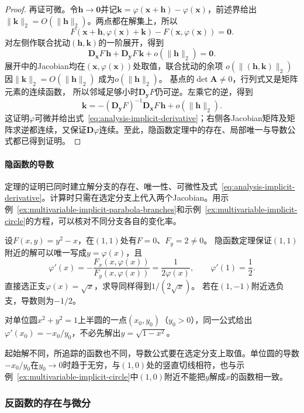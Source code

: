 \begin{proof}
再证可微。令$\bm{h}\to\bm{0}$并记$\bm{k}=\varphi(\bm{x}+\bm{h})-\varphi(\bm{x})$，前述界给出$\lVert\bm{k}\rVert_2=O(\lVert\bm{h}\rVert_2)$。两点都在解集上，所以
\[
 F(\bm{x}+\bm{h},\varphi(\bm{x})+\bm{k})-F(\bm{x},\varphi(\bm{x}))=\bm{0}.
\]
对左侧作联合扰动$(\bm h,\bm k)$的一阶展开，得到
\[
 \bm{D}_{\bm{x}}F\,\bm{h}+\bm{D}_{\bm{y}}F\,\bm{k}+o(\lVert\bm{h}\rVert_2)=\bm{0}.
\]
展开中的Jacobian均在$(\bm x,\varphi(\bm x))$处取值，联合扰动的余项
$o(\lVert(\bm h,\bm k)\rVert_2)$因$\lVert\bm k\rVert_2=O(\lVert\bm h\rVert_2)$
成为$o(\lVert\bm h\rVert_2)$。
基点的$\det\bm A\neq0$，行列式又是矩阵元素的连续函数，
所以邻域足够小时$\bm D_{\bm y}F$仍可逆。左乘它的逆，得到
\[
 \bm{k}=-(\bm{D}_{\bm{y}}F)^{-1}\bm{D}_{\bm{x}}F\,\bm{h}+o(\lVert\bm{h}\rVert_2).
\]
这证明$\varphi$可微并给出式~\eqref{eq:analysis-implicit-derivative}；右侧各Jacobian矩阵及矩阵求逆都连续，又保证$\bm{D}\varphi$连续。至此，隐函数定理中的存在、局部唯一与导数公式都已得到证明。
\end{proof}

\paragraph{隐函数的导数}

定理的证明已同时建立解分支的存在、唯一性、可微性及式~\eqref{eq:analysis-implicit-derivative}。计算时只需在选定分支上代入两个Jacobian。用示例~\ref{ex:multivariable-implicit-parabola-branches}和示例~\ref{ex:multivariable-implicit-circle}的方程，可以核对不同分支各自的变化率。

\begin{example}[隐函数分支的导数]
设$F(x,y)=y^2-x$，在$(1,1)$处有$F=0$、$F_y=2\neq0$。
隐函数定理保证$(1,1)$附近的解可以唯一写成$y=\varphi(x)$，且
\[
 \varphi'(x)=-\frac{F_x(x,\varphi(x))}{F_y(x,\varphi(x))}
 =\frac1{2\varphi(x)},\qquad \varphi'(1)=\frac12.
\]
直接选正支$\varphi(x)=\sqrt x$，求导同样得到$1/(2\sqrt x)$。
若在$(1,-1)$附近选负支，导数则为$-1/2$。

对单位圆$x^2+y^2=1$上半圆的一点$(x_0,y_0)$（$y_0>0$），同一公式给出$\varphi'(x_0)=-x_0/y_0$，不必先解出$y=\sqrt{1-x^2}$。
\end{example}

起始解不同，所追踪的函数也不同，导数公式要在选定分支上取值。单位圆的导数$-x_0/y_0$在$y_0\to0$时趋于无穷，与$(1,0)$处的竖直切线相符，也与示例~\ref{ex:multivariable-implicit-circle}中$(1,0)$附近不能把$y$解成$x$的函数相一致。

\subsubsection{反函数的存在与微分}

